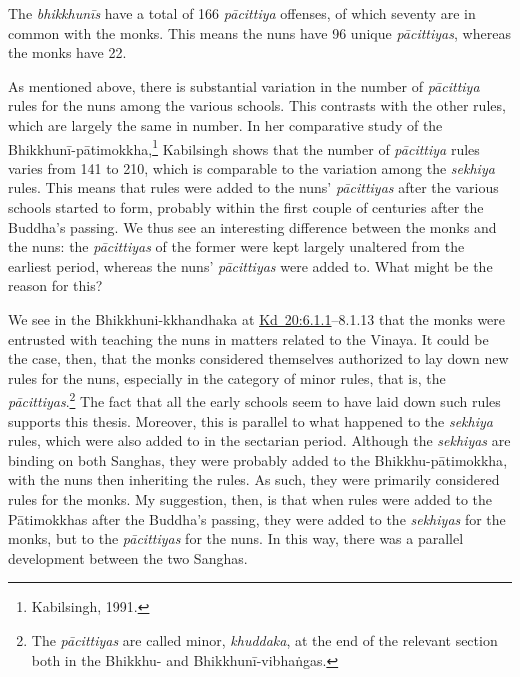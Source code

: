 \documentclass[12pt,openany]{book}%
\begin{document}
The \textit{\textsanskrit{bhikkhunīs}} have a total of 166 \textit{\textsanskrit{pācittiya}} offenses, of which seventy are in common with the monks. This means the nuns have 96 unique \textit{\textsanskrit{pācittiyas}}, whereas the monks have 22.

As mentioned above, there is substantial variation in the number of \textit{\textsanskrit{pācittiya}} rules for the nuns among the various schools. This contrasts with the other rules, which are largely the same in number. In her comparative study of the \textsanskrit{Bhikkhunī}-\textsanskrit{pātimokkha},\footnote{Kabilsingh, 1991. } Kabilsingh shows that the number of \textit{\textsanskrit{pācittiya}} rules varies from 141 to 210, which is comparable to the variation among the \textit{sekhiya} rules. This means that rules were added to the nuns’ \textit{\textsanskrit{pācittiyas}} after the various schools started to form, probably within the first couple of centuries after the Buddha’s passing. We thus see an interesting difference between the monks and the nuns: the \textit{\textsanskrit{pācittiyas}} of the former were kept largely unaltered from the earliest period, whereas the nuns’ \textit{\textsanskrit{pācittiyas}} were added to. What might be the reason for this?

We see in the Bhikkhuni-kkhandhaka at \href{https://suttacentral.net/pli-tv-kd20/en/brahmali\#6.1.1}{Kd~20:6.1.1}–8.1.13 that the monks were entrusted with teaching the nuns in matters related to the Vinaya. It could be the case, then, that the monks considered themselves authorized to lay down new rules for the nuns, especially in the category of minor rules, that is, the \textit{\textsanskrit{pācittiyas}}.\footnote{The \textit{\textsanskrit{pācittiyas}} are called minor, \textit{khuddaka}, at the end of the relevant section both in the Bhikkhu- and \textsanskrit{Bhikkhunī}-\textsanskrit{vibhaṅgas}. } The fact that all the early schools seem to have laid down such rules supports this thesis. Moreover, this is parallel to what happened to the \textit{sekhiya} rules, which were also added to in the sectarian period. Although the \textit{sekhiyas} are binding on both Sanghas, they were probably added to the Bhikkhu-\textsanskrit{pātimokkha}, with the nuns then inheriting the rules. As such, they were primarily considered rules for the monks. My suggestion, then, is that when rules were added to the \textsanskrit{Pātimokkhas} after the Buddha’s passing, they were added to the \textit{sekhiyas} for the monks, but to the \textit{\textsanskrit{pācittiyas}} for the nuns. In this way, there was a parallel development between the two Sanghas.
\end{document}

